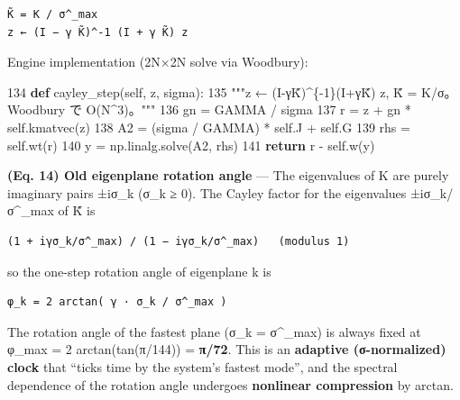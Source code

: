 \documentclass[
  a4paper,
]{ltjsarticle}
\newenvironment{Shaded}{}{}
\newcommand{\ControlFlowTok}[1]{\textcolor[rgb]{0.00,0.44,0.13}{\textbf{#1}}}
\newcommand{\DecValTok}[1]{\textcolor[rgb]{0.25,0.63,0.44}{#1}}
\newcommand{\KeywordTok}[1]{\textcolor[rgb]{0.00,0.44,0.13}{\textbf{#1}}}
\newcommand{\NormalTok}[1]{#1}
\newcommand{\OperatorTok}[1]{\textcolor[rgb]{0.40,0.40,0.40}{#1}}
\newcommand{\StringTok}[1]{\textcolor[rgb]{0.25,0.44,0.63}{#1}}
\newcommand{\VariableTok}[1]{\textcolor[rgb]{0.10,0.09,0.49}{#1}}
\begin{document}
\begin{verbatim}
K̃ = K / σ^_max
z ← (I − γ K̃)^-1 (I + γ K̃) z
\end{verbatim}

Engine implementation (2N×2N solve via Woodbury):

\begin{Shaded}
\begin{Highlighting}[]
   \DecValTok{134}      \KeywordTok{def}\NormalTok{ cayley\_step(}\VariableTok{self}\NormalTok{, z, sigma):}
   \DecValTok{135}          \StringTok{"""z ← (I{-}γK̃)\^{}\{{-}1\}(I+γK̃) z, K̃ = K/σ。Woodbury で O(N\^{}3)。"""}
   \DecValTok{136}\NormalTok{          gn }\OperatorTok{=}\NormalTok{ GAMMA }\OperatorTok{/}\NormalTok{ sigma}
   \DecValTok{137}\NormalTok{          r }\OperatorTok{=}\NormalTok{ z }\OperatorTok{+}\NormalTok{ gn }\OperatorTok{*} \VariableTok{self}\NormalTok{.kmatvec(z)}
   \DecValTok{138}\NormalTok{          A2 }\OperatorTok{=}\NormalTok{ (sigma }\OperatorTok{/}\NormalTok{ GAMMA) }\OperatorTok{*} \VariableTok{self}\NormalTok{.J }\OperatorTok{+} \VariableTok{self}\NormalTok{.G}
   \DecValTok{139}\NormalTok{          rhs }\OperatorTok{=} \VariableTok{self}\NormalTok{.wt(r)}
   \DecValTok{140}\NormalTok{          y }\OperatorTok{=}\NormalTok{ np.linalg.solve(A2, rhs)}
   \DecValTok{141}          \ControlFlowTok{return}\NormalTok{ r }\OperatorTok{{-}} \VariableTok{self}\NormalTok{.w(y)}
\end{Highlighting}
\end{Shaded}

\textbf{(Eq. 14) Old eigenplane rotation angle} --- The eigenvalues of K
are purely imaginary pairs ±iσ\_k (σ\_k ≥ 0). The Cayley factor for the
eigenvalues ±iσ\_k/σ\^{}\_max of K̃ is

\begin{verbatim}
(1 + iγσ_k/σ^_max) / (1 − iγσ_k/σ^_max)   (modulus 1)
\end{verbatim}

so the one-step rotation angle of eigenplane k is

\begin{verbatim}
φ_k = 2 arctan( γ · σ_k / σ^_max )
\end{verbatim}

The rotation angle of the fastest plane (σ\_k = σ\^{}\_max) is always
fixed at φ\_max = 2 arctan(tan(π/144)) = \textbf{π/72}. This is an
\textbf{adaptive (σ-normalized) clock} that ``ticks time by the system's
fastest mode'', and the spectral dependence of the rotation angle
undergoes \textbf{nonlinear compression} by arctan.
\end{document}
